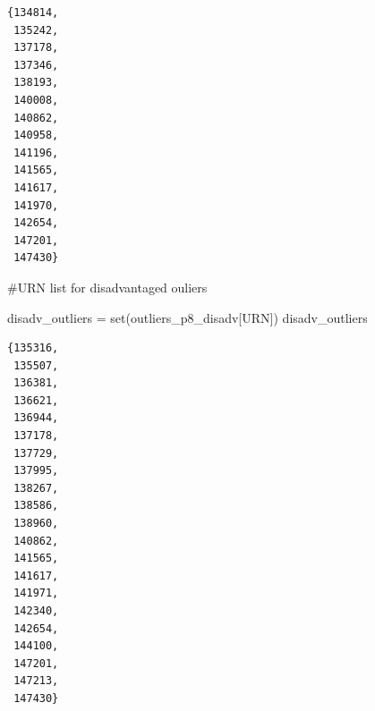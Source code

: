 \documentclass[
  letterpaper,
  DIV=11,
  numbers=noendperiod]{scrartcl}
\newenvironment{Shaded}{\begin{snugshade}}{\end{snugshade}}
\newcommand{\BuiltInTok}[1]{\textcolor[rgb]{0.00,0.23,0.31}{#1}}
\newcommand{\CommentTok}[1]{\textcolor[rgb]{0.37,0.37,0.37}{#1}}
\newcommand{\NormalTok}[1]{\textcolor[rgb]{0.00,0.23,0.31}{#1}}
\newcommand{\OperatorTok}[1]{\textcolor[rgb]{0.37,0.37,0.37}{#1}}
\newcommand{\StringTok}[1]{\textcolor[rgb]{0.13,0.47,0.30}{#1}}
\begin{document}
\begin{verbatim}
{134814,
 135242,
 137178,
 137346,
 138193,
 140008,
 140862,
 140958,
 141196,
 141565,
 141617,
 141970,
 142654,
 147201,
 147430}
\end{verbatim}

\begin{Shaded}
\begin{Highlighting}[]
\CommentTok{\#URN list for disadvantaged ouliers }

\NormalTok{disadv\_outliers }\OperatorTok{=} \BuiltInTok{set}\NormalTok{(outliers\_p8\_disadv[}\StringTok{\textquotesingle{}URN\textquotesingle{}}\NormalTok{])}
\NormalTok{disadv\_outliers}
\end{Highlighting}
\end{Shaded}

\begin{verbatim}
{135316,
 135507,
 136381,
 136621,
 136944,
 137178,
 137729,
 137995,
 138267,
 138586,
 138960,
 140862,
 141565,
 141617,
 141971,
 142340,
 142654,
 144100,
 147201,
 147213,
 147430}
\end{verbatim}
\end{document}

